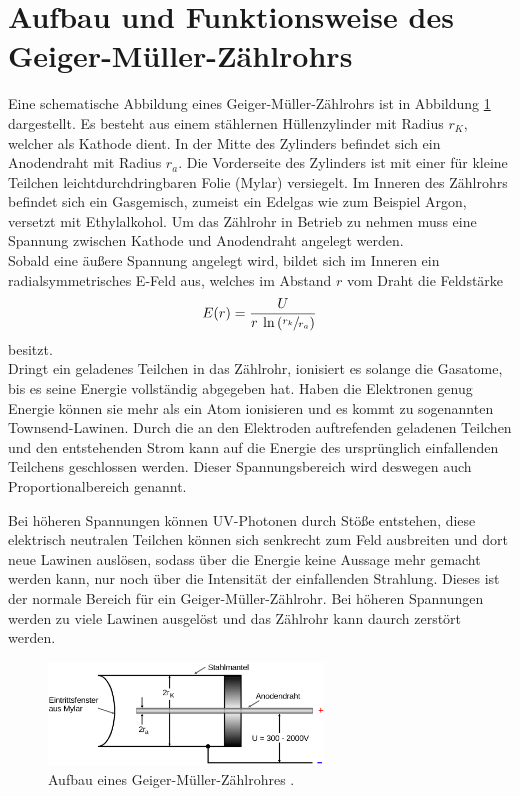 \setcounter{page}{1}
\section{Aufbau und Funktionsweise des Geiger-Müller-Zählrohrs}
\label{sec:aufbau}
Eine schematische Abbildung eines Geiger-Müller-Zählrohrs ist in
Abbildung \ref{fig:geiger} dargestellt.
Es besteht aus einem stählernen Hüllenzylinder mit Radius $r_K$, welcher als
Kathode dient. In der Mitte des Zylinders befindet sich ein Anodendraht mit
Radius $r_a$.
Die Vorderseite des Zylinders ist mit einer für kleine Teilchen
leichtdurchdringbaren Folie (Mylar) versiegelt. Im Inneren des Zählrohrs
befindet sich ein Gasgemisch, zumeist ein Edelgas wie zum Beispiel Argon,
versetzt mit Ethylalkohol. Um das Zählrohr in Betrieb zu nehmen muss eine
Spannung zwischen Kathode und Anodendraht angelegt werden.
\\
Sobald eine äußere Spannung angelegt wird, bildet sich im Inneren ein
radialsymmetrisches E-Feld aus, welches im Abstand $r$ vom Draht die Feldstärke
\begin{equation}
  E(r) = \frac{U}{r\:\ln\left(\sfrac{r_k}{r_a}\right)}
\end{equation}
besitzt.\\
Dringt ein geladenes Teilchen in das Zählrohr, ionisiert es solange die Gasatome,
bis es seine Energie vollständig abgegeben hat.
Haben die Elektronen genug Energie können sie mehr als ein Atom ionisieren und
es kommt zu sogenannten Townsend-Lawinen. Durch die an den Elektroden
auftrefenden geladenen Teilchen und den entstehenden Strom kann auf die
Energie des ursprünglich einfallenden Teilchens geschlossen werden.
Dieser Spannungsbereich wird deswegen auch Proportionalbereich genannt.

Bei höheren Spannungen können UV-Photonen durch Stöße entstehen, diese
elektrisch neutralen Teilchen können sich senkrecht zum Feld ausbreiten und
dort neue Lawinen auslösen, sodass über die Energie keine Aussage mehr gemacht
werden kann, nur noch über die Intensität der einfallenden Strahlung.
Dieses ist der normale Bereich für ein Geiger-Müller-Zählrohr.
Bei höheren Spannungen werden zu viele Lawinen ausgelöst und das Zählrohr kann
daurch zerstört werden.

\begin{figure}
  \centering
  \includegraphics[width=0.65\textwidth]{content/geiger.png}
  \caption{Aufbau eines Geiger-Müller-Zählrohres \cite{Anleitung}.}
  \label{fig:geiger}
\end{figure}
